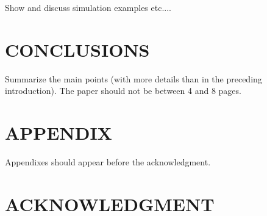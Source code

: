 \documentclass[letterpaper, 10 pt, conference]{ieeeconf}  %
\begin{document}
Show and discuss simulation examples etc....



\section{CONCLUSIONS}

Summarize the main points (with more details than in the preceding introduction).
The paper should not be between 4 and 8 pages.



\addtolength{\textheight}{-12cm}   %



\section*{APPENDIX}

Appendixes should appear before the acknowledgment.

\section*{ACKNOWLEDGMENT}






\end{document}
